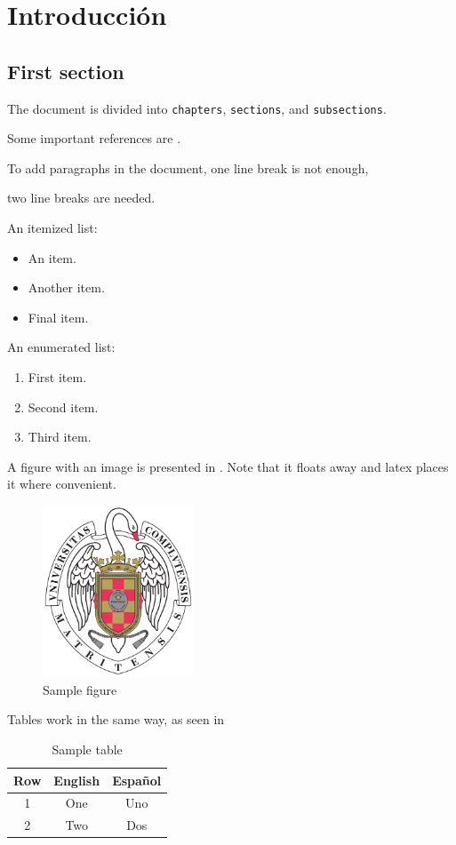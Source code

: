 \chapter{Introducción}

	\section{First section}
		The document is divided into \texttt{chapters}, \texttt{sections}, and \texttt{subsections}.

		Some important references are \cite{einstein,latexcompanion,knuthwebsite}.

		To add paragraphs in the document, 
		one line break is not enough,

		two line breaks are needed.

		An itemized list:

		\begin{itemize}
			\item An item.
			\item Another item.
			\item Final item.
		\end{itemize}

		An enumerated list:

		\begin{enumerate}
			\item First item.
			\item Second item.
			\item Third item.
		\end{enumerate}

		A figure with an image is presented in . Note that it floats away and latex places it where convenient.

		\begin{figure}
			\centering
			\includegraphics[width=0.4\textwidth]{Images/escudo_ucm.pdf}
			\caption{Sample figure}
			\label{fig:figura}
		\end{figure}

		Tables work in the same way, as seen in 

		\begin{table}
			\centering
			\begin{tabular}{c|c|c}
				Row & English & Español \\\hline\hline
				1 & One & Uno \\
				2 & Two & Dos \\
			\end{tabular}
			\caption{Sample table}
			\label{tab:tabla}
		\end{table}
	\blindtext